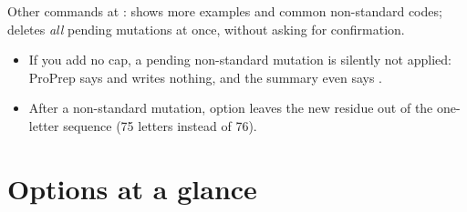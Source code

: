 \medskip
Other commands at :  shows more examples and
common non-standard codes;  deletes \emph{all} pending mutations at
once, without asking for confirmation.

\begin{watchout}
\begin{itemize}
  \item If you add no cap, a pending non-standard mutation is silently not
        applied: ProPrep says  and writes
        nothing, and the summary even says .
  \item After a non-standard mutation,  option  leaves the new
        residue out of the one-letter sequence (75 letters instead of 76).
\end{itemize}
\end{watchout}

\section{Options at a glance}


